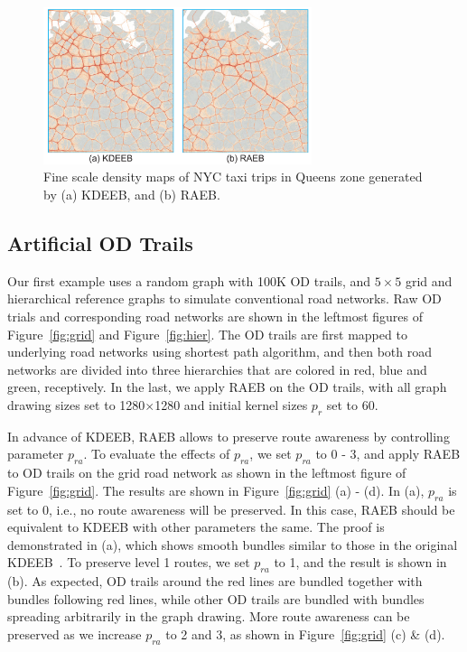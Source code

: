 \begin{figure}[t]
	\centering
	\includegraphics[width=0.7\textwidth]{figure/edgebundling/fig9_study2-2/NYC-zoom}
	\vspace{-1mm}
	\caption{Fine scale density maps of NYC taxi trips in Queens zone generated by (a) KDEEB, and (b) RAEB.}
	\label{fig:nyc-zoom}
	\vspace{-1mm}
\end{figure}

\subsection{Artificial OD Trails}
\label{ssec:study1}

Our first example uses a random graph with 100K OD trails, and $5 \times 5$ grid and hierarchical reference graphs to simulate conventional road networks.
Raw OD trials and corresponding road networks are shown in the leftmost figures of Figure~\ref{fig:grid} and Figure~\ref{fig:hier}.
The OD trails are first mapped to underlying road networks using shortest path algorithm, and then both road networks are divided into three hierarchies that are colored in red, blue and green, receptively.
In the last, we apply RAEB on the OD trails, with all graph drawing sizes set to 1280$\times$1280 and initial kernel sizes $p_r$ set to 60.

In advance of KDEEB, RAEB allows to preserve route awareness by controlling parameter $p_{ra}$.
To evaluate the effects of $p_{ra}$, we set $p_{ra}$ to 0 - 3, and apply RAEB to OD trails on the grid road network as shown in the leftmost figure of Figure~\ref{fig:grid}.
The results are shown in Figure~\ref{fig:grid} (a) - (d).
In (a), $p_{ra}$ is set to 0, i.e., no route awareness will be preserved.
In this case, RAEB should be equivalent to KDEEB with other parameters the same.
The proof is demonstrated in (a), which shows smooth bundles similar to those in the original KDEEB~\cite{hurter2012graph}.
To preserve level 1 routes, we set $p_{ra}$ to 1, and the result is shown in (b).
As expected, OD trails around the red lines are bundled together with bundles following red lines, while other OD trails are bundled with bundles spreading arbitrarily in the graph drawing.
More route awareness can be preserved as we increase $p_{ra}$ to 2 and 3, as shown in Figure~\ref{fig:grid} (c) \& (d).

